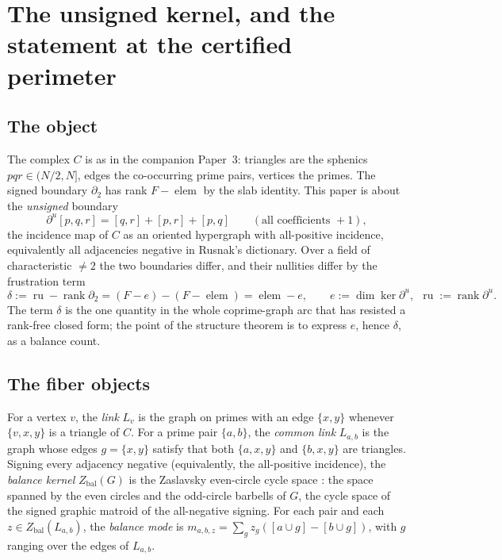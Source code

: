 \documentclass[11pt,reqno]{amsart}
\theoremstyle{plain}
\theoremstyle{definition}
\theoremstyle{plain}
\theoremstyle{definition}
\newcommand{\rank}{\operatorname{rank}}
\newcommand{\elem}{\operatorname{elem}}
\newcommand{\ru}{\operatorname{ru}}
\newcommand{\Zbal}{Z_{\mathrm{bal}}}
\newcommand{\dbu}{\partial^{u}}
\newcommand{\dd}{\delta}
\begin{document}
\section{The unsigned kernel, and the statement at the certified perimeter}\label{sec:stmt}

\subsection{The object}
The complex $C$ is as in the companion Paper~3: triangles are the sphenics $pqr\in(N/2,N]$, edges
the co-occurring prime pairs, vertices the primes. The signed boundary $\partial_2$ has rank
$F-\elem$ by the slab identity. This paper is about the \emph{unsigned} boundary
\[
\dbu[p,q,r]=[q,r]+[p,r]+[p,q]\qquad(\text{all coefficients }+1),
\]
the incidence map of $C$ as an oriented hypergraph with all-positive incidence, equivalently all
adjacencies negative in Rusnak's dictionary. Over a field of characteristic $\ne2$ the two
boundaries differ, and their nullities differ by the frustration term
\[
\dd:=\ru-\rank\partial_2=(F-e)-(F-\elem)=\elem-e,\qquad e:=\dim\ker\dbu,\ \ \ru:=\rank\dbu.
\]
The term $\dd$ is the one quantity in the whole coprime-graph arc that has resisted a rank-free
closed form; the point of the structure theorem is to express $e$, hence $\dd$, as a balance
count.

\subsection{The fiber objects}
For a vertex $v$, the \emph{link} $L_v$ is the graph on primes with an edge $\{x,y\}$ whenever
$\{v,x,y\}$ is a triangle of $C$. For a prime pair $\{a,b\}$, the \emph{common link} $L_{a,b}$
is the graph whose edges $g=\{x,y\}$ satisfy that both $\{a,x,y\}$ and $\{b,x,y\}$ are triangles.
Signing every adjacency negative (equivalently, the all-positive incidence), the \emph{balance
kernel} $\Zbal(G)$ is the Zaslavsky even-circle cycle space \cite{Zaslavsky}: the space spanned
by the even circles and the odd-circle barbells of $G$, the cycle space of the signed graphic
matroid of the all-negative signing. For each pair and each $z\in\Zbal(L_{a,b})$, the
\emph{balance mode} is $m_{a,b,z}=\sum_g z_g([a\cup g]-[b\cup g])$, with $g$ ranging over the
edges of $L_{a,b}$.
\end{document}

